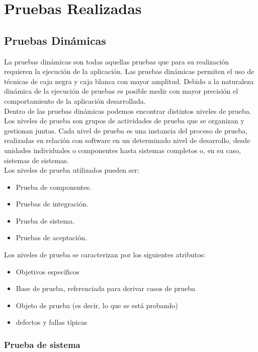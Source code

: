 \chapter{Pruebas Realizadas} \label{cap:nueve}
\section{Pruebas Dinámicas}

La pruebas dinámicas son todas aquellas pruebas que para su realización requieren la ejecución de la aplicación. Las pruebas dinámicas permiten el uso de técnicas de caja negra y caja blanca con mayor amplitud. Debido a la naturaleza dinámica de la ejecución de pruebas es posible medir con mayor precisión el comportamiento de la aplicación desarrollada.\\

Dentro de las pruebas dinámicas podemos encontrar distintos niveles de prueba. Los niveles de prueba son grupos de actividades de prueba que se organizan y gestionan juntas. Cada nivel de prueba es una instancia del proceso de prueba, realizadas en relación con software en un determinado nivel de desarrollo, desde unidades individuales o componentes hasta sistemas completos o, en su caso, sistemas de sistemas.\\

Los niveles de prueba utilizados pueden ser:

\begin{itemize}
	\item Prueba de componentes.
	\item Pruebas de integración.
	\item Prueba de sistema.
	\item Pruebas de aceptación.
\end{itemize}

Los niveles de prueba se caracterizan por los siguientes atributos:

\begin{itemize}
	\item Objetivos específicos
	\item Base de prueba, referenciada para derivar casos de prueba
	\item Objeto de prueba (es decir, lo que se está probando)
	\item defectos y fallas típicas
\end{itemize}

\subsection{Prueba de sistema}

